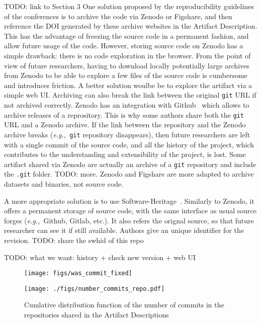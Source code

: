 \documentclass[sigconf]{acmart}
\newcommand{\eg}{\emph{e.g.,}}
\newcommand{\ad}{Artifact Description}
\newcommand{\todo}[1]{{\color{red}TODO: #1}}
\begin{document}
\todo{link to Section 3}
One solution proposed by the reproducibility guidelines of the conferences is to archive the code via Zenodo or Figshare, and then reference the DOI generated by these archive websites in the \ad.
This has the advantage of freezing the source code in a permanent fashion, and allow future usage of the code.
However, storing source code on Zenodo has a simple drawback: there is no code exploration in the browser.
From the point of view of future researchers, having to download locally potentially large archives from Zenodo to be able to explore a few files of the source code is cumbersome and introduces friction.
A better solution woulbe be to explore the artifact via a simple web UI.
Archiving can also break the link between the original \texttt{git} URL if not archived correctly.
Zenodo has an integration with Github\ \cite{github_zenodo} which allows to archive releases of a reprository.
This is why some authors share both the \texttt{git} URL and a Zenodo archive.
If the link between the repository and the Zenodo archive breaks (\eg\ \texttt{git} repository disappears), then future researchers are left with a single commit of the source code, and all the history of the project, which contributes to the understanding and extensibility of the project, is lost.
Some artifact shared via Zenodo are actually an archive of a \texttt{git} repository and include the \texttt{.git} folder.
\todo{more.}
Zenodo and Figshare are more adapted to archive datasets and binaries, not source code.

A more appropriate solution is to use Software-Heritage\ \cite{swheritage, di2017software}.
Similarly to Zenodo, it offers a permanent storage of source code, with the same interface as usual source forges (\eg\ Github, Gitlab, etc.).
It also refers the orignal source, so that future researcher can see it if still available.
Authors give an unique identifier for the revision. 
\todo{share the swhid of this repo}

\todo{what we want: history + check new version + web UI}

\begin{figure}
  \centering
  \texttt{[image: figs/was\_commit\_fixed]}
  \caption{}\label{fig:was_commit_fixed}
\end{figure}

\begin{figure}
  \centering
  \texttt{[image: ./figs/number\_commits\_repo.pdf]}
  \caption{Cumlative distribution function of the number of commits in the repositories shared in the \ad s}\label{fig:number_commits_repo}
\end{figure}
\end{document}
